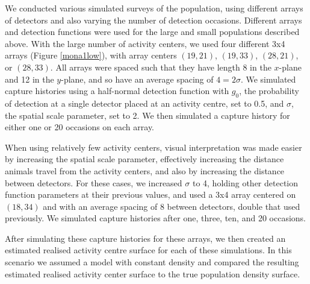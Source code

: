 \documentclass[10pt,a4paper]{article}
\begin{document}
We conducted various simulated surveys of the population, using different arrays of detectors and also varying the number of detection occasions. Different arrays and detection functions were used for the large and small populations described above. With the large number of activity centers, we used four different 3x4 arrays (Figure \ref{mona1low}), with array centers $(19,21)$, $(19,33)$, $(28, 21)$, or $(28, 33)$. All arrays were spaced such that they have length 8 in the $x$-plane and 12 in the $y$-plane, and so have an average spacing of $4=2\sigma$. We simulated capture histories using a half-normal detection function with $g_0$, the probability of detection at a single detector placed at an activity centre, set to 0.5, and $\sigma$, the spatial scale parameter, set to 2. We then simulated a capture history for either one or 20 occasions on each array.

When using relatively few activity centers, visual interpretation was made easier by increasing the spatial scale parameter, effectively increasing the distance animals travel from the activity centers, and also by increasing the distance between detectors. For these cases, we increased $\sigma$ to 4, holding other detection function parameters at their previous values, and used a 3x4 array centered on $(18,34)$ and with an average spacing of 8 between detectors, double that used previously. We simulated capture histories after one, three, ten, and 20 occasions. 

After simulating these capture histories for these arrays, we then created an estimated realised activity centre surface for each of these simulations. In this scenario we assumed a model with constant density and compared the resulting estimated realised activity center surface to the true population density surface.
\end{document}

